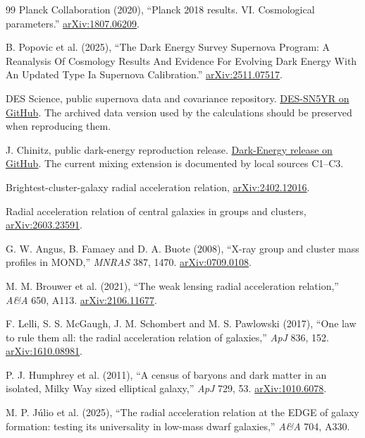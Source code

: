 \begin{thebibliography}{99}
 Planck Collaboration (2020),
``Planck 2018 results. VI. Cosmological parameters.''
\href{https://arxiv.org/abs/1807.06209}{arXiv:1807.06209}.

 B. Popovic et al. (2025),
``The Dark Energy Survey Supernova Program: A Reanalysis Of Cosmology
Results And Evidence For Evolving Dark Energy With An Updated Type Ia
Supernova Calibration.''
\href{https://arxiv.org/abs/2511.07517}{arXiv:2511.07517}.

 DES Science, public supernova data and covariance
repository. \href{https://github.com/des-science/DES-SN5YR}{DES-SN5YR on
GitHub}. The archived data version used by the calculations should be
preserved when reproducing them.

 J. Chinitz, public dark-energy reproduction release.
\href{https://github.com/jakechinitz/dark-energy/releases/tag/Dark-Energy}
{Dark-Energy release on GitHub}. The current mixing extension is
documented by local sources C1--C3.


 Brightest-cluster-galaxy radial acceleration relation,
\href{https://arxiv.org/abs/2402.12016}{arXiv:2402.12016}.

 Radial acceleration relation of central galaxies in
groups and clusters, \href{https://arxiv.org/abs/2603.23591}{arXiv:2603.23591}.

 G. W. Angus, B. Famaey and D. A. Buote (2008), ``X-ray
group and cluster mass profiles in MOND,'' \emph{MNRAS} 387, 1470.
\href{https://arxiv.org/abs/0709.0108}{arXiv:0709.0108}.

 M. M. Brouwer et al. (2021), ``The weak lensing radial
acceleration relation,'' \emph{A\&A} 650, A113.
\href{https://arxiv.org/abs/2106.11677}{arXiv:2106.11677}.

 F. Lelli, S. S. McGaugh, J. M. Schombert and M. S. Pawlowski
(2017), ``One law to rule them all: the radial acceleration relation of
galaxies,'' \emph{ApJ} 836, 152.
\href{https://arxiv.org/abs/1610.08981}{arXiv:1610.08981}.

 P. J. Humphrey et al. (2011), ``A census of baryons and
dark matter in an isolated, Milky Way sized elliptical galaxy,'' \emph{ApJ}
729, 53. \href{https://arxiv.org/abs/1010.6078}{arXiv:1010.6078}.

 M. P. J\'ulio et al. (2025), ``The radial acceleration
relation at the EDGE of galaxy formation: testing its universality in
low-mass dwarf galaxies,'' \emph{A\&A} 704, A330.


\end{thebibliography}
